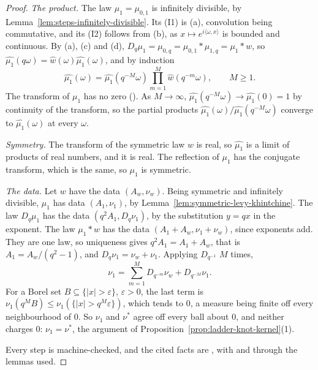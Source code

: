 \begin{proof}
\leanok
{}
\emph{The product.} The law $\mu_1 = \mu_{0,1}$ is infinitely divisible, by
Lemma~\ref{lem:steps-infinitely-divisible}. Its (I1) is (a), convolution being commutative, and its
(I2) follows from (b), as $x \mapsto e^{i\langle\omega, x\rangle}$ is bounded and continuous. By
(a), (c) and (d), $D_q\mu_1 = \mu_{0,q} = \mu_{0,1} * \mu_{1,q} = \mu_1 * w$, so
$\widehat{\mu_1}(q\omega) = \widehat{w}(\omega)\widehat{\mu_1}(\omega)$, and by induction
\[
\widehat{\mu_1}(\omega) = \widehat{\mu_1}(q^{-M}\omega)\prod_{m=1}^M\widehat{w}(q^{-m}\omega),
\qquad M \ge 1 .
\]
The transform of $\mu_1$ has no zero (). As $M \to \infty$,
$\widehat{\mu_1}(q^{-M}\omega) \to \widehat{\mu_1}(0) = 1$ by continuity of the transform, so the
partial products $\widehat{\mu_1}(\omega)/\widehat{\mu_1}(q^{-M}\omega)$ converge to
$\widehat{\mu_1}(\omega)$ at every $\omega$.

\emph{Symmetry.} The transform of the symmetric law $w$ is real, so $\widehat{\mu_1}$ is a limit of
products of real numbers, and it is real. The reflection of $\mu_1$ has the conjugate transform,
which is the same, so $\mu_1$ is symmetric.

\emph{The data.} Let $w$ have the data $(A_w, \nu_w)$. Being symmetric and infinitely divisible,
$\mu_1$ has data $(A_1, \nu_1)$, by Lemma~\ref{lem:symmetric-levy-khintchine}. The law $D_q\mu_1$
has the data $(q^2A_1, D_q\nu_1)$, by the substitution $y = qx$ in the exponent. The law
$\mu_1 * w$ has the data $(A_1 + A_w, \nu_1 + \nu_w)$, since exponents add. They are one law, so
uniqueness gives $q^2A_1 = A_1 + A_w$, that is $A_1 = A_w/(q^2 - 1)$, and
$D_q\nu_1 = \nu_w + \nu_1$. Applying $D_{q^{-1}}$ $M$ times,
\[
\nu_1 = \sum_{m=1}^M D_{q^{-m}}\nu_w + D_{q^{-M}}\nu_1 .
\]
For a Borel set $B \subseteq \{|x| > \varepsilon\}$, $\varepsilon > 0$, the last term is
$\nu_1(q^MB) \le \nu_1(\{|x| > q^M\varepsilon\})$, which tends to $0$, a \Levy{} measure being
finite off every neighbourhood of $0$. So $\nu_1$ and $\nu^*$ agree off every ball about $0$, and
neither charges $0$: $\nu_1 = \nu^*$, the argument of Proposition~\ref{prop:ladder-knot-kernel}(1).

Every step is machine-checked, and the cited facts are , with  and
 through the lemmas used.
\end{proof}

